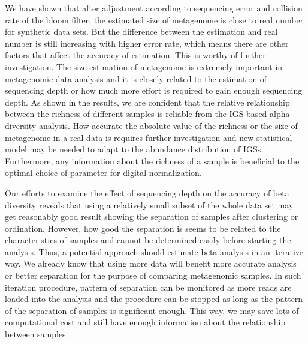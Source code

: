 We have shown that after adjustment according to sequencing error and collision
rate of the bloom filter, the estimated size of metagenome is close to real
number for synthetic data sets. But the difference between the estimation and
real number is still increasing with higher error rate, which means there are
other factors that affect the accuracy of estimation. This is worthy of further
investigation. The size estimation of metagenome is extremely important in
metagenomic data analysis and it is closely related to the estimation of
sequencing depth or how much more effort is required to gain enough sequencing
depth. As shown in the results, we are confident that the relative relationship 
between the richness of different samples is reliable from the IGS based alpha
diversity analysis. How accurate the absolute value of the richness or the size
of metagenome in a real data is requires further investigation and new  
statistical model may be needed to adapt to the abundance distribution of IGSs.    
Furthermore, any information about the richness of a sample is beneficial to
the optimal choice of parameter for digital normalization.

Our efforts to examine the effect of sequencing depth on the accuracy of beta
diversity reveals that using a relatively small subset of the whole data set may
get reasonably good result showing the separation of samples after clustering
or ordination. However, how good the separation is seems to be related to the
characteristics of samples and cannot be determined easily before starting the
analysis. Thus, a potential approach should estimate beta analysis in an iterative
way. We already know that using more data will benefit more accurate analysis or better
separation for the purpose of comparing metagenomic samples. In such
iteration procedure, pattern of separation can be monitored as more reads
are loaded into the analysis and the procedure can be stopped as long as the
pattern of the separation of samples is significant enough. This way, we may
save lots of computational cost and still have enough information about the
relationship between samples. 
 
    
    
    
    
    
    

